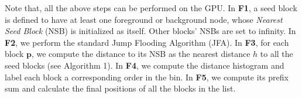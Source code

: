 Note that, all the above steps can be performed on the GPU.
In \textbf{F1}, a seed block is defined to have at least one foreground or background node, whose \textit{Nearest Seed Block} (NSB) is initialized as itself.
Other blocks' NSBs are set to infinity.
In \textbf{F2}, we perform the standard Jump Flooding Algorithm (JFA).
In \textbf{F3}, for each block $\mathbf{p}$, we compute the distance to its NSB as the nearest distance $h$ to all the seed blocks (see Algorithm 1).
In \textbf{F4}, we compute the distance histogram and label each block a corresponding order in the bin.
In \textbf{F5}, we compute its prefix sum \cite{11MG} and calculate the final positions of all the blocks in the list.

\begin{figure}
\centering
{}
\\
\end{figure}
